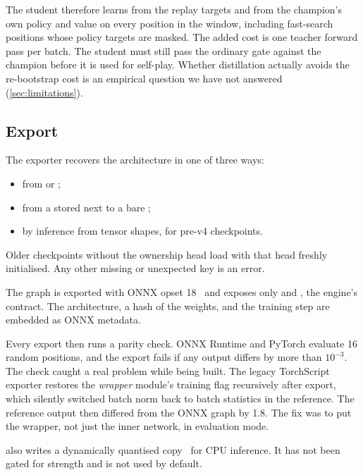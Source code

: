 The student therefore learns from the replay targets and from the champion's own policy
and value on every position in the window, including fast-search positions whose policy
targets are masked. The added cost is one teacher forward pass per batch. The student must
still pass the ordinary gate against the champion before it is used for self-play. Whether
distillation actually avoids the re-bootstrap cost is an empirical question we have not
answered (\cref{sec:limitations}).

\subsection{Export}\label{sec:learner-export}

The exporter recovers the architecture in one of three ways:
\begin{itemize}
  \item from  or ;
  \item from a  stored next to a bare ;
  \item by inference from tensor shapes, for pre-v4 checkpoints.
\end{itemize}
Older checkpoints without the ownership head load with that head freshly initialised. Any
other missing or unexpected key is an error.

The graph is exported with ONNX opset 18~\citep{onnx2017} and exposes only
 and , the engine's contract. The architecture, a hash of
the weights, and the training step are embedded as ONNX metadata.

Every export then runs a parity check. ONNX Runtime and PyTorch evaluate 16 random
positions, and the export fails if any output differs by more than $10^{-3}$. The check
caught a real problem while being built. The legacy TorchScript exporter restores the
\emph{wrapper} module's training flag recursively after export, which silently switched
batch norm back to batch statistics in the reference. The reference output then differed
from the ONNX graph by 1.8. The fix was to put the wrapper, not just the inner network,
in evaluation mode.

 also writes a dynamically quantised copy~\citep{jacob2018quantization}
for CPU inference. It has not been gated for strength and is not used by default.
